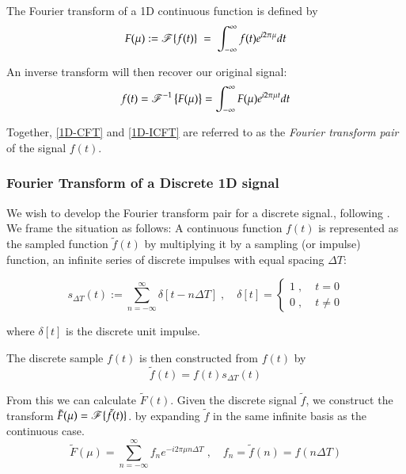 The Fourier transform of a 1D continuous function is defined by
\begin{equation} \label{1D-CFT}
F(\mu) := \operatorname{\mathscr{F}}\{f(t)\} \;=\; \int_{-\infty}^{\infty} f(t) e^{i2\pi \mu } dt
\end{equation}

An inverse transform will then recover our original signal:
\begin{equation} \label{1D-ICFT}
f(t) = \operatorname{\mathscr{F}}^{-1}\left\{F(\mu)\right\} = \int_{-\infty}^{\infty} F(\mu) e^{i2\pi \mu t} dt
\end{equation}

Together, \cref{1D-CFT} and \cref{1D-ICFT} are referred to as the \textit{Fourier transform pair} of the signal $f(t)$. 

\subsubsection{Fourier Transform of a Discrete 1D signal}

We wish to develop the Fourier transform pair for a discrete signal., following \cite{DIPGW}. We frame the situation
as follows: A continuous function $f(t)$ is represented as the sampled function $\tilde{f}(t)$ by multiplying it by a sampling (or impulse) function, an infinite series of discrete impulses with equal spacing $\Delta T$:

\begin{equation} \label{1D-sampling-function}
s_{\Delta T}(t) := \sum_{n=-\infty}^{\infty} \delta[t - n\Delta T] \;,\quad
\delta[t] = \begin{cases} 1 \;,\; & t=0 \\ 0 \;,\;& t \ne 0 \end{cases}
\end{equation}

where $\delta[t]$ is the discrete unit impulse.

The discrete sample $f(t)$ is then constructed from $f(t)$ by
\begin{equation} \label{1D-discrete-sample}
\tilde{f}(t) = f(t) s_{\Delta T}(t)
\end{equation}

From this we can calculate $\tilde{F}(t)$.
Given the discrete signal $\tilde{f}$, we construct the transform
$\tilde{F}(\mu) = \operatorname{\mathscr{F}}\{\tilde{f}(t)\}$. by expanding $\tilde{f}$ in the same infinite basis as the continuous case.
\begin{equation} \label{1D-DFT-transform}
\tilde{F}(\mu) = \sum_{n=-\infty}^{\infty} f_n e^{-i 2\pi \mu n \Delta T} \;,\quad
f_n = \tilde{f}(n) = f(n\Delta T)
\end{equation}

